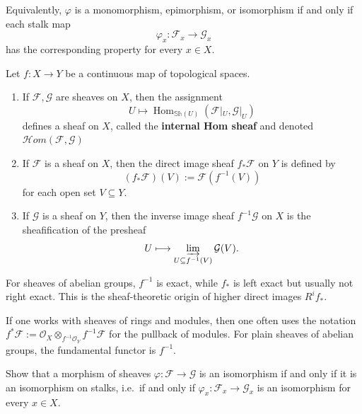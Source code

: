 \documentclass[12pt]{article}
\begin{document}
Equivalently, $\varphi$ is a monomorphism, epimorphism, or isomorphism if and only if each stalk map
\[
    \varphi_x : \mathcal F_x \to \mathcal G_x
\]
has the corresponding property for every $x \in X$.

\begin{proposition}
    Let $f : X \to Y$ be a continuous map of topological spaces.

    \begin{enumerate}
        \item If $\mathcal F, \mathcal G$ are sheaves on $X$, then the assignment
              \[
                  U \longmapsto \operatorname{Hom}_{\mathbb{Sh}(U)}(\mathcal F|_U, \mathcal G|_U)
              \]
              defines a sheaf on $X$, called the \textbf{internal Hom sheaf} and denoted $\mathcal H\!om(\mathcal F,\mathcal G)$

        \item If $\mathcal F$ is a sheaf on $X$, then the direct image sheaf $f_*\mathcal F$ on $Y$ is defined by
              \[
                  (f_*\mathcal F)(V) := \mathcal F(f^{-1}(V))
              \]
              for each open set $V \subseteq Y$.

        \item If $\mathcal G$ is a sheaf on $Y$, then the inverse image sheaf $f^{-1}\mathcal G$ on $X$ is the sheafification of the presheaf
              \[
                  U \longmapsto \varinjlim_{U \subseteq f^{-1}(V)} \mathcal G(V).
              \]
    \end{enumerate}
\end{proposition}

\begin{remark}
    For sheaves of abelian groups, $f^{-1}$ is exact, while $f_*$ is left exact but usually not right exact. This is the sheaf-theoretic origin of higher direct images $R^if_*$.
\end{remark}

\begin{remark}
    If one works with sheaves of rings and modules, then one often uses the notation $f^*\mathcal F := \mathcal O_X \otimes_{f^{-1}\mathcal O_Y} f^{-1}\mathcal F$ for the pullback of modules. For plain sheaves of abelian groups, the fundamental functor is $f^{-1}$.
\end{remark}


\begin{exercise}
    Show that a morphism of sheaves $\varphi : \mathcal F \to \mathcal G$
    is an isomorphism if and only if it is an isomorphism on stalks, i.e.\ if and only if $\varphi_x : \mathcal F_x \to \mathcal G_x$ is an isomorphism for every $x \in X$.
\end{exercise}
\end{document}
